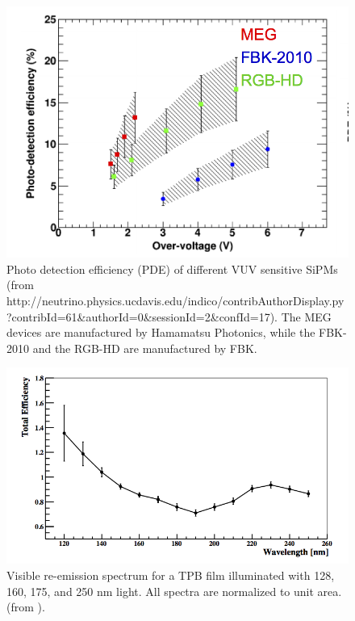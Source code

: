 \documentclass[review]{elsarticle}
\begin{document}
\begin{figure}[!htbp]
	\centering
	\includegraphics[scale=0.6]{../img/PDEVUV.png}
	\caption{Photo detection efficiency (PDE) of different VUV sensitive SiPMs
	(from http://neutrino.physics.ucdavis.edu/indico/contribAuthorDisplay.py?contribId=61\&authorId=0\&sessionId=2\&confId=17). The MEG devices are
	manufactured by Hamamatsu Photonics, while the FBK-2010 and the RGB-HD
	are manufactured by FBK.  }\label{fig.vuv} 
\end{figure}

\begin{figure}[!htbp]
	\centering
	\includegraphics[scale=0.6]{../img/TPBEfficiency.png}
	\caption{Visible re-emission spectrum for a TPB film illuminated with 
	128, 160, 175, and 250 nm light. All spectra are normalized to unit area.
	(from \cite{Gehman:2011xm}).  }\label{fig.tpb} 
\end{figure}
\end{document}
